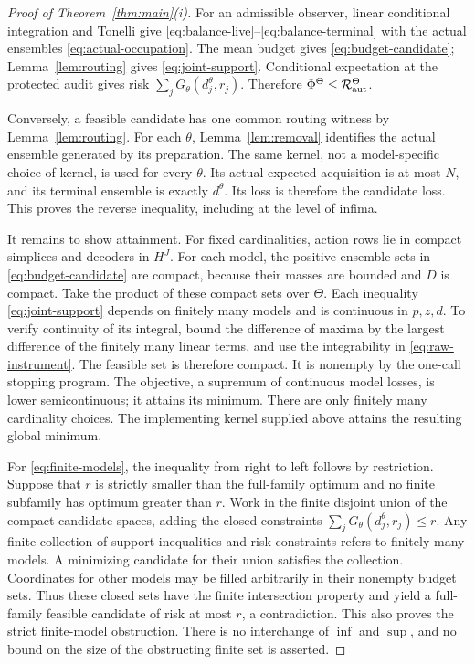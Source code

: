 \begin{proof}[Proof of Theorem~\ref{thm:main}(i)]
For an admissible observer, linear conditional integration and Tonelli give \eqref{eq:balance-live}--\eqref{eq:balance-terminal} with the actual ensembles \eqref{eq:actual-occupation}. The mean budget gives \eqref{eq:budget-candidate}; Lemma~\ref{lem:routing} gives \eqref{eq:joint-support}. Conditional expectation at the protected audit gives risk $\sum_jG_\theta(d_j^\theta,r_j)$. Therefore $\Phi^\Theta\le\mathcal R_{\mathrm{aut}}^\Theta$.

Conversely, a feasible candidate has one common routing witness by Lemma~\ref{lem:routing}. For each $\theta$, Lemma~\ref{lem:removal} identifies the actual ensemble generated by its preparation. The same kernel, not a model-specific choice of kernel, is used for every $\theta$. Its actual expected acquisition is at most $N$, and its terminal ensemble is exactly $d^\theta$. Its loss is therefore the candidate loss. This proves the reverse inequality, including at the level of infima.

It remains to show attainment. For fixed cardinalities, action rows lie in compact simplices and decoders in $H^J$. For each model, the positive ensemble sets in \eqref{eq:budget-candidate} are compact, because their masses are bounded and $D$ is compact. Take the product of these compact sets over $\Theta$. Each inequality \eqref{eq:joint-support} depends on finitely many models and is continuous in $p,z,d$. To verify continuity of its integral, bound the difference of maxima by the largest difference of the finitely many linear terms, and use the integrability in \eqref{eq:raw-instrument}. The feasible set is therefore compact. It is nonempty by the one-call stopping program. The objective, a supremum of continuous model losses, is lower semicontinuous; it attains its minimum. There are only finitely many cardinality choices. The implementing kernel supplied above attains the resulting global minimum.

For \eqref{eq:finite-models}, the inequality from right to left follows by restriction. Suppose that $r$ is strictly smaller than the full-family optimum and no finite subfamily has optimum greater than $r$. Work in the finite disjoint union of the compact candidate spaces, adding the closed constraints $\sum_jG_\theta(d_j^\theta,r_j)\le r$. Any finite collection of support inequalities and risk constraints refers to finitely many models. A minimizing candidate for their union satisfies the collection. Coordinates for other models may be filled arbitrarily in their nonempty budget sets. Thus these closed sets have the finite intersection property and yield a full-family feasible candidate of risk at most $r$, a contradiction. This also proves the strict finite-model obstruction. There is no interchange of $\inf$ and $\sup$, and no bound on the size of the obstructing finite set is asserted.
\end{proof}

